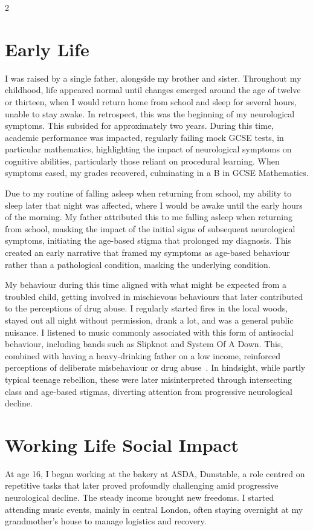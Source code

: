 \documentclass{article}
\begin{document}
\begin{multicols}{2}
\section*{Early Life}
I was raised by a single father, alongside my brother and sister. Throughout my childhood, life appeared normal until changes emerged around the age of twelve or thirteen, when I would return home from school and sleep for several hours, unable to stay awake. In retrospect, this was the beginning of my neurological symptoms. This subsided for approximately two years. During this time, academic performance was impacted, regularly failing mock GCSE tests, in particular mathematics, highlighting the impact of neurological symptoms on cognitive abilities, particularly those reliant on procedural learning. When symptoms eased, my grades recovered, culminating in a B in GCSE Mathematics.

Due to my routine of falling asleep when returning from school, my ability to sleep later that night was affected, where I would be awake until the early hours of the morning. My father attributed this to me falling asleep when returning from school, masking the impact of the initial signs of subsequent neurological symptoms, initiating the age-based stigma that prolonged my diagnosis. This created an early narrative that framed my symptoms as age-based behaviour rather than a pathological condition, masking the underlying condition.

My behaviour during this time aligned with what might be expected from a troubled child, getting involved in mischievous behaviours that later contributed to the perceptions of drug abuse. I regularly started fires in the local woods, stayed out all night without permission, drank a lot, and was a general public nuisance. I listened to music commonly associated with this form of antisocial behaviour, including bands such as Slipknot and System Of A Down. This, combined with having a heavy-drinking father on a low income, reinforced perceptions of deliberate misbehaviour or drug abuse~\cite{childrens2017}. In hindsight, while partly typical teenage rebellion, these were later misinterpreted through intersecting class and age-based stigmas, diverting attention from progressive neurological decline.

\section*{Working Life Social Impact}
At age 16, I began working at the bakery at ASDA, Dunstable, a role centred on repetitive tasks that later proved profoundly challenging amid progressive neurological decline. The steady income brought new freedoms. I started attending music events, mainly in central London, often staying overnight at my grandmother’s house to manage logistics and recovery.


\end{multicols}
\end{document}
